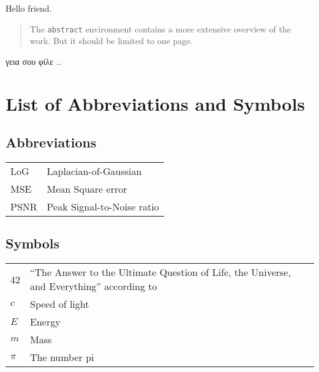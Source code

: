 \documentclass[master=elt,masteroption=eg]{kulemt}
\begin{document}


\begin{preface}
  
   Hello friend.
  
\end{preface}

\tableofcontents*

\begin{abstract}
  The \texttt{abstract} environment contains a more extensive overview of
  the work. But it should be limited to one page.
\end{abstract}


\begin{abstract*}

   γεια σου φίλε ..
   
\end{abstract*}

\listoffiguresandtables




\chapter{List of Abbreviations and Symbols}
\section*{Abbreviations}
\begin{flushleft}
  \renewcommand{\arraystretch}{1.1}
  \begin{tabularx}{\textwidth}{@{}p{12mm}X@{}}
    LoG   & Laplacian-of-Gaussian \\
    MSE   & Mean Square error \\
    PSNR  & Peak Signal-to-Noise ratio \\
  \end{tabularx}
\end{flushleft}
\section*{Symbols}
\begin{flushleft}
  \renewcommand{\arraystretch}{1.1}
  \begin{tabularx}{\textwidth}{@{}p{12mm}X@{}}
    42    & ``The Answer to the Ultimate Question of Life, the Universe,
            and Everything'' according to \cite{h2g2} \\
    $c$   & Speed of light \\
    $E$   & Energy \\
    $m$   & Mass \\
    $\pi$ & The number pi \\
  \end{tabularx}
\end{flushleft}
\end{document}
